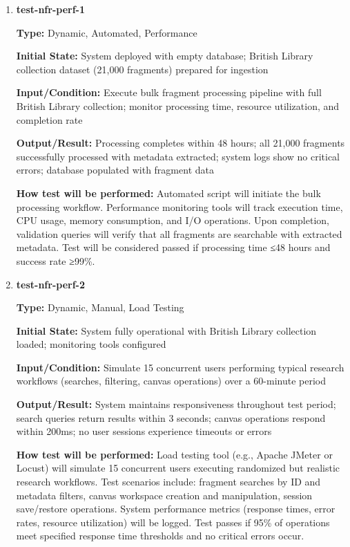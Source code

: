 \documentclass[12pt, titlepage]{article}
\begin{document}
\begin{enumerate}

\item \textbf{test-nfr-perf-1}

\textbf{Type:} Dynamic, Automated, Performance
					
\textbf{Initial State:} System deployed with empty database; British Library collection dataset (21,000 fragments) prepared for ingestion
					
\textbf{Input/Condition:} Execute bulk fragment processing pipeline with full British Library collection; monitor processing time, resource utilization, and completion rate
					
\textbf{Output/Result:} Processing completes within 48 hours; all 21,000 fragments successfully processed with metadata extracted; system logs show no critical errors; database populated with fragment data
					
\textbf{How test will be performed:} Automated script will initiate the bulk processing workflow. Performance monitoring tools will track execution time, CPU usage, memory consumption, and I/O operations. Upon completion, validation queries will verify that all fragments are searchable with extracted metadata. Test will be considered passed if processing time ≤48 hours and success rate ≥99\%.

\item \textbf{test-nfr-perf-2}

\textbf{Type:} Dynamic, Manual, Load Testing
					
\textbf{Initial State:} System fully operational with British Library collection loaded; monitoring tools configured
					
\textbf{Input/Condition:} Simulate 15 concurrent users performing typical research workflows (searches, filtering, canvas operations) over a 60-minute period
					
\textbf{Output/Result:} System maintains responsiveness throughout test period; search queries return results within 3 seconds; canvas operations respond within 200ms; no user sessions experience timeouts or errors
					
\textbf{How test will be performed:} Load testing tool (e.g., Apache JMeter or Locust) will simulate 15 concurrent users executing randomized but realistic research workflows. Test scenarios include: fragment searches by ID and metadata filters, canvas workspace creation and manipulation, session save/restore operations. System performance metrics (response times, error rates, resource utilization) will be logged. Test passes if 95\% of operations meet specified response time thresholds and no critical errors occur.

\end{enumerate}
\end{document}

